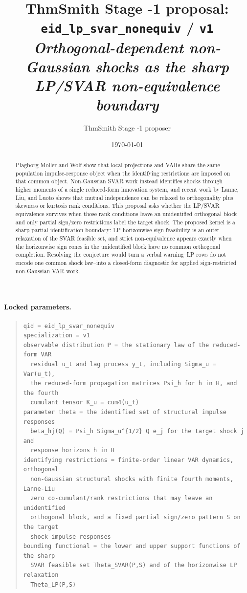 \documentclass[11pt]{article}
\title{ThmSmith Stage -1 proposal: \texttt{eid\_lp\_svar\_nonequiv} / \texttt{v1}%
  \\ \large\textit{Orthogonal-dependent non-Gaussian shocks as the sharp LP/SVAR non-equivalence boundary}}
\author{ThmSmith Stage -1 proposer}
\date{\today}
\theoremstyle{definition}
\theoremstyle{plain}
\theoremstyle{remark}
\begin{document}
\maketitle


\paragraph{Locked parameters.}
\begin{quote}
\begin{verbatim}
qid = eid_lp_svar_nonequiv
specialization = v1
observable distribution P = the stationary law of the reduced-form VAR
  residual u_t and lag process y_t, including Sigma_u = Var(u_t),
  the reduced-form propagation matrices Psi_h for h in H, and the fourth
  cumulant tensor K_u = cum4(u_t)
parameter theta = the identified set of structural impulse responses
  beta_hj(Q) = Psi_h Sigma_u^{1/2} Q e_j for the target shock j and
  response horizons h in H
identifying restrictions = finite-order linear VAR dynamics, orthogonal
  non-Gaussian structural shocks with finite fourth moments, Lanne-Liu
  zero co-cumulant/rank restrictions that may leave an unidentified
  orthogonal block, and a fixed partial sign/zero pattern S on the target
  shock impulse responses
bounding functional = the lower and upper support functions of the sharp
  SVAR feasible set Theta_SVAR(P,S) and of the horizonwise LP relaxation
  Theta_LP(P,S)
\end{verbatim}
\end{quote}

\begin{abstract}
Plagborg-Moller and Wolf show that local projections and VARs share the same population impulse-response object when the identifying restrictions are imposed on that common object.  Non-Gaussian SVAR work instead identifies shocks through higher moments of a single reduced-form innovation system, and recent work by Lanne, Liu, and Luoto shows that mutual independence can be relaxed to orthogonality plus skewness or kurtosis rank conditions.  This proposal asks whether the LP/SVAR equivalence survives when those rank conditions leave an unidentified orthogonal block and only partial sign/zero restrictions label the target shock.  The proposed kernel is a sharp partial-identification boundary: LP horizonwise sign feasibility is an outer relaxation of the SVAR feasible set, and strict non-equivalence appears exactly when the horizonwise sign cones in the unidentified block have no common orthogonal completion.  Resolving the conjecture would turn a verbal warning--LP rows do not encode one common shock law--into a closed-form diagnostic for applied sign-restricted non-Gaussian VAR work.
\end{abstract}
\end{document}
